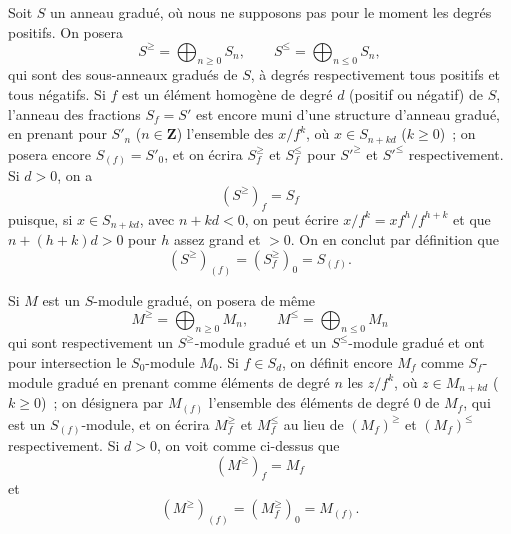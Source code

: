 \begin{env}[8.2.1]
\label{II.8.2.1-fr}
Soit $S$ un anneau gradué, où nous ne supposons pas pour le moment les degrés
positifs. On posera
\begin{equation}
\label{II.8.2.1.1-fr}
  S^{\geq}=\bigoplus_{n\geq0}S_n,
  \qquad
  S^{\leq}=\bigoplus_{n\leq0}S_n,
\tag{8.2.1.1}
\end{equation}
qui sont des sous-anneaux gradués de $S$, à degrés respectivement tous
positifs et tous négatifs. Si $f$ est un élément homogène de degré $d$
(positif ou négatif) de $S$, l'anneau des fractions $S_f=S'$ est encore muni
d'une structure d'anneau gradué, en prenant pour $S'_n$ ($n\in\mathbf{Z}$)
l'ensemble des $x/f^k$, où $x\in S_{n+kd}$ ($k\geq0$)~; on posera encore
$S_{(f)}=S'_0$, et on écrira $S_f^{\geq}$ et $S_f^{\leq}$ pour $S'^{\geq}$ et
$S'^{\leq}$ respectivement. Si $d>0$, on a
\begin{equation}
\label{II.8.2.1.2-fr}
  (S^{\geq})_f=S_f
\tag{8.2.1.2}
\end{equation}
puisque, si $x\in S_{n+kd}$, avec $n+kd<0$, on peut écrire
$x/f^k=xf^h/f^{h+k}$ et que $n+(h+k)d>0$ pour $h$ assez grand et $>0$. On en
conclut par définition que
\begin{equation}
\label{II.8.2.1.3-fr}
  (S^{\geq})_{(f)}=(S_f^{\geq})_0=S_{(f)}.
\tag{8.2.1.3}
\end{equation}

Si $M$ est un $S$-module gradué, on posera de même
\begin{equation}
\label{II.8.2.1.4-fr}
  M^{\geq}=\bigoplus_{n\geq0}M_n,
  \qquad
  M^{\leq}=\bigoplus_{n\leq0}M_n
\tag{8.2.1.4}
\end{equation}
qui sont respectivement un $S^{\geq}$-module gradué et un $S^{\leq}$-module
gradué et ont pour intersection le $S_0$-module $M_0$. Si $f\in S_d$, on
définit encore $M_f$ comme $S_f$-module gradué en prenant comme éléments de
degré $n$ les $z/f^k$, où $z\in M_{n+kd}$ ($k\geq0$)~; on désignera par
$M_{(f)}$ l'ensemble des éléments de degré $0$ de $M_f$, qui est un
$S_{(f)}$-module, et on écrira $M_f^{\geq}$ et $M_f^{\leq}$ au lieu de
$(M_f)^{\geq}$ et $(M_f)^{\leq}$ respectivement. Si $d>0$, on voit comme
ci-dessus que
\begin{equation}
\label{II.8.2.1.5-fr}
  (M^{\geq})_f=M_f
\tag{8.2.1.5}
\end{equation}
et
\begin{equation}
\label{II.8.2.1.6-fr}
  (M^{\geq})_{(f)}=(M_f^{\geq})_0=M_{(f)}.
\tag{8.2.1.6}
\end{equation}
\end{env}

